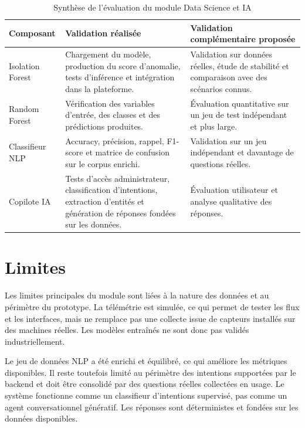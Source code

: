 \begin{table}[H]
\centering
\small
\caption{Synthèse de l'évaluation du module Data Science et IA}
\label{tab:synthese-evaluation-ds-ia}
\begin{tabular}{|>{\raggedright\arraybackslash}p{}|>{\raggedright\arraybackslash}p{}|>{\raggedright\arraybackslash}p{}|}
\hline
\rowcolor{SectionColor!12}
\textbf{Composant} & \textbf{Validation réalisée} & \textbf{Validation complémentaire proposée} \\
\hline
Isolation Forest & Chargement du modèle, production du score d'anomalie, tests d'inférence et intégration dans la plateforme. & Validation sur données réelles, étude de stabilité et comparaison avec des scénarios connus. \\
\hline
Random Forest & Vérification des variables d'entrée, des classes et des prédictions produites. & Évaluation quantitative sur un jeu de test indépendant et plus large. \\
\hline
Classifieur NLP & Accuracy, précision, rappel, F1-score et matrice de confusion sur le corpus enrichi. & Validation sur un jeu indépendant et davantage de questions réelles. \\
\hline
Copilote IA & Tests d'accès administrateur, classification d'intentions, extraction d'entités et génération de réponses fondées sur les données. & Évaluation utilisateur et analyse qualitative des réponses. \\
\hline
\end{tabular}
\end{table}

\section{Limites}

Les limites principales du module sont liées à la nature des données et au périmètre du prototype. La télémétrie est simulée, ce qui permet de tester les flux et les interfaces, mais ne remplace pas une collecte issue de capteurs installés sur des machines réelles. Les modèles entraînés ne sont donc pas validés industriellement.

Le jeu de données NLP a été enrichi et équilibré, ce qui améliore les métriques disponibles. Il reste toutefois limité au périmètre des intentions supportées par le backend et doit être consolidé par des questions réelles collectées en usage. Le système fonctionne comme un classifieur d'intentions supervisé, pas comme un agent conversationnel génératif. Les réponses sont déterministes et fondées sur les données disponibles.

